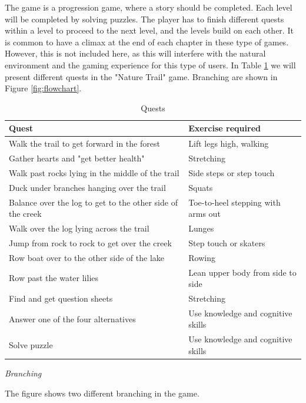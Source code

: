 The game is a progression game, where a story should be completed. Each level will be completed by solving puzzles. The player has to finish different quests within a level to proceed to the next level, and the levels build on each other. It is common to have a climax at the end of each chapter in these type of games. However, this is not included here, as this will interfere with the natural environment and the gaming experience for this type of users. In Table \ref{tab:quests1} we will present different quests in the "Nature Trail" game. Branching are shown in Figure \ref{fig:flowchart}.
  
\begin{table}
\begin{tabular}{|>{\raggedright}p{}|p{}|}
\hline
\textbf{Quest} & \textbf{Exercise required}  \\ \hline
Walk the trail to get forward in the forest & Lift legs high, walking  \\ \hline
Gather hearts and "get better health" &  Stretching \\ \hline
Walk past rocks lying in the middle of the trail & Side steps or step touch  \\ \hline
Duck under branches hanging over the trail & Squats
\\ \hline
Balance over the log to get to the other side of the creek & Toe-to-heel stepping with arms out \\ \hline
Walk over the log lying across the trail & Lunges \\ \hline
Jump from rock to rock to get over the creek & Step touch or skaters \\ \hline
Row boat over to the other side of the lake & Rowing \\ \hline
Row past the water lilies & Lean upper body from side to side \\ \hline
Find and get question sheets  & Stretching \\ \hline
Answer one of the four alternatives & Use knowledge and cognitive skills \\ \hline
Solve puzzle & Use knowledge and cognitive skills \\ \hline
\end{tabular}
\caption[Quests in the "Nature trail" game]{Quests}
\label{tab:quests1}
\end{table}
 \newpage
\emph{Branching}

The figure shows two different branching in the game.

